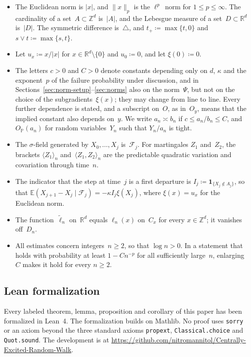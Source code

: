 \documentclass[11pt]{amsart}
\theoremstyle{plain}
\theoremstyle{definition}
\newcommand{\Z}{\mathbb Z}
\newcommand{\R}{\mathbb R}
\renewcommand{\P}{\mathbb P}
\newcommand{\E}{\mathbb E}
\newcommand{\drift}{\kappa}
\newcommand{\gauge}{\Psi}
\newcommand{\ind}{\mathbf 1}
\numberwithin{equation}{section}
\begin{document}
\begin{itemize}
\item The Euclidean norm is $|x|$, and $\|x\|_p$ is the $\ell^p$~norm for $1\leq p\leq\infty$. The cardinality of a set~$A\subset\Z^d$ is~$|A|$, and the Lebesgue measure of a set~$D\subset\R^d$ is~$|D|$. The symmetric difference is~$\triangle$, and $t_+\coloneqq\max\{t,0\}$ and $s\vee t\coloneqq\max\{s,t\}$.
\item Let $u_x\coloneqq x/|x|$ for $x\in\R^d\setminus\{0\}$ and $u_0\coloneqq0$, and let $\xi(0)\coloneqq0$.
\item The letters $c>0$ and $C>0$ denote constants depending only on $d$, $\drift$ and the exponent~$p$ of the failure probability under discussion, and in Sections~\ref{sec:norm-setup}--\ref{sec:norms} also on the norm~$\gauge$, but not on the choice of the subgradients~$\xi(x)$; they may change from line to line. Every further dependence is stated, and a subscript on~$O$, as in~$O_y$, means that the implied constant also depends on~$y$. We write $a_n\asymp b_n$ if $c\leq a_n/b_n\leq C$, and $O_{\P}(a_n)$ for random variables~$Y_n$ such that $Y_n/a_n$ is tight.
\item The $\sigma$-field generated by $X_0,\ldots,X_j$ is~$\mathcal F_j$. For martingales $Z_1$ and~$Z_2$, the brackets $\langle Z_1\rangle_n$ and~$\langle Z_1,Z_2\rangle_n$ are the predictable quadratic variation and covariation through time~$n$.
\item The indicator that the step at time~$j$ is a first departure is $I_j\coloneqq\ind_{\{X_j\notin A_j\}}$, so that $\E(X_{j+1}-X_j\mid\mathcal F_j)=-\drift I_j\xi(X_j)$, where $\xi(x)=u_x$ for the Euclidean norm.
\item The function~$\widetilde\ell_n$ on~$\R^d$ equals $\ell_n(x)$ on~$C_x$ for every $x\in\Z^d$; it vanishes off~$D_n$.
\item All estimates concern integers~$n\geq2$, so that $\log n>0$. In a statement that holds with probability at least $1-Cn^{-p}$ for all sufficiently large~$n$, enlarging~$C$ makes it hold for every $n\geq2$.
\end{itemize}

\subsection{Lean formalization}\label{ssec:formalization}
Every labeled theorem, lemma, proposition and corollary of this paper has been formalized in Lean~4. The formalization builds on Mathlib.  No proof uses \texttt{sorry} or an axiom beyond the three standard axioms \texttt{propext}, \texttt{Classical.choice} and \texttt{Quot.sound}. The development is at \url{https://github.com/nitromannitol/Centrally-Excited-Random-Walk}.
\end{document}
